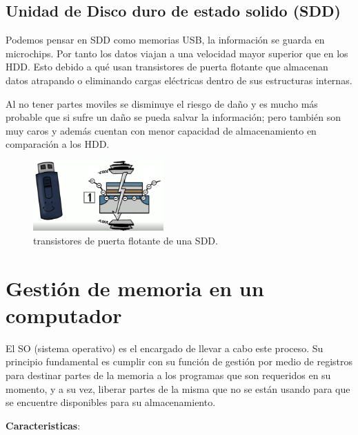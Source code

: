 \documentclass{article}
\begin{document}
\subsection{Unidad de Disco duro de estado solido (SDD)}
Podemos pensar en SDD como memorias USB, la información se guarda en microchips. Por tanto los datos viajan a una velocidad mayor superior que en los HDD. Esto debido a qué usan transistores de puerta flotante que almacenan datos atrapando o eliminando cargas eléctricas dentro de sus estructuras internas. 

Al no tener partes moviles se disminuye el riesgo de daño y es mucho más probable que si sufre un daño se pueda salvar la información; pero también son muy caros y además cuentan con menor capacidad de almacenamiento en comparación a los HDD.

\begin{figure}[h]
\includegraphics[width=5cm]{SDD.PNG}
\centering
\caption{transistores de puerta flotante de una SDD.\cite{TEDwebsite}}
\label{SDD.PNG}
\end{figure}
\section{Gestión de memoria en un computador}
 El SO (sistema operativo) es el encargado de llevar a cabo este proceso. Su principio fundamental es cumplir con su función de gestión por medio de registros para destinar partes de la memoria a los programas que son requeridos en su momento, y a su vez, liberar partes de la misma que no se están usando para que se encuentre disponibles para su almacenamiento. 
\vspace{0.2cm}

\textbf{Caracteristicas}:
\end{document}
